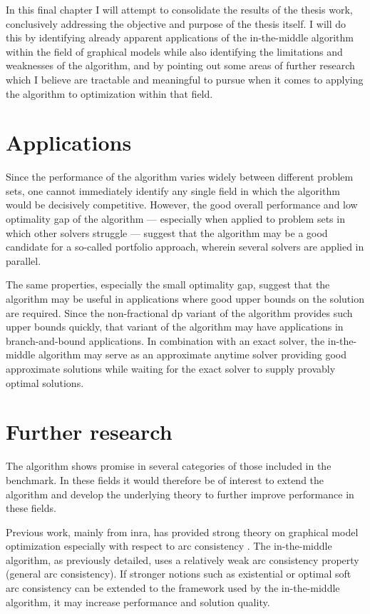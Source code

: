 In this final chapter I will attempt to consolidate the results of the thesis work, conclusively addressing the objective and purpose of the thesis itself.
I will do this by identifying already apparent applications of the in-the-middle algorithm within the field of graphical models while also identifying the limitations and weaknesses of the algorithm, and by pointing out some areas of further research which I believe are tractable and meaningful to pursue when it comes to applying the algorithm to optimization within that field.

\section{Applications}
Since the performance of the algorithm varies widely between different problem sets, one cannot immediately identify any single field in which the algorithm would be decisively competitive.
However, the good overall performance and low optimality gap of the algorithm --- especially when applied to problem sets in which other solvers struggle --- suggest that the algorithm may be a good candidate for a so-called portfolio approach, wherein several solvers are applied in parallel.

The same properties, especially the small optimality gap, suggest that the algorithm may be useful in applications where good upper bounds on the solution are required.
Since the non-fractional \gls{dp} variant of the algorithm provides such upper bounds quickly, that variant of the algorithm may have applications in branch-and-bound applications.
In combination with an exact solver, the in-the-middle algorithm may serve as an approximate anytime solver providing good approximate solutions while waiting for the exact solver to supply provably optimal solutions.

\section{Further research}
The algorithm shows promise in several categories of those included in the benchmark.
In these fields it would therefore be of interest to extend the algorithm and develop the underlying theory to further improve performance in these fields.

Previous work, mainly from \gls{inra}, has provided strong theory on graphical model optimization especially with respect to arc consistency \parencite{Cooper10,Cooper08,deGivry06,deGivry05}.
The in-the-middle algorithm, as previously detailed, uses a relatively weak arc consistency property (general arc consistency).
If stronger notions such as existential \parencite{deGivry05} or optimal soft \parencite{Cooper10} arc consistency can be extended to the framework used by the in-the-middle algorithm, it may increase performance and solution quality.

